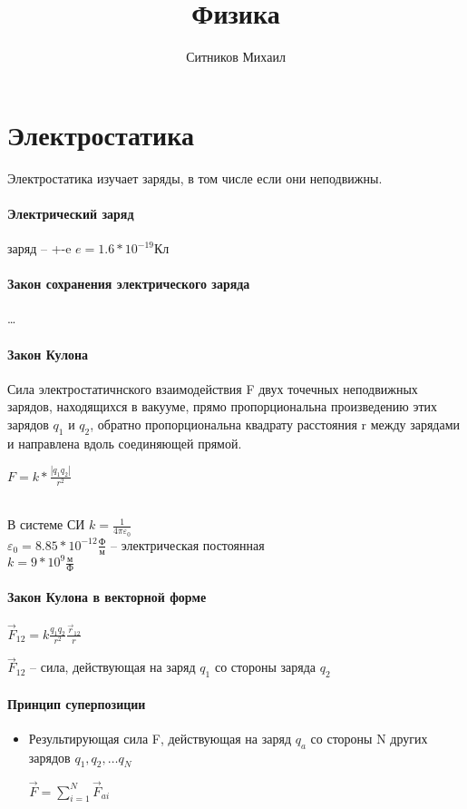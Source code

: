 \documentclass[a4paper]{article}
\title{Физика}
\author{Ситников Михаил}
\begin{document}
\maketitle
\tableofcontents
\newpage
\section{Электростатика}
Электростатика изучает заряды, в том числе если они неподвижны.
\paragraph{Электрический заряд}
\begin{itemize}
   заряд -- +-e
  $e = 1.6 * 10^{-19}$Кл

\end{itemize}
\paragraph{Закон сохранения электрического заряда}
\ldots
\paragraph{Закон Кулона}
Сила электростатичнского взаимодействия F двух точечных неподвижных зарядов, находящихся в вакууме, прямо пропорциональна произведению этих зарядов $q_1$ и $q_2$, обратно пропорциональна квадрату расстояния r между зарядами и направлена вдоль соединяющей прямой.
\begin{center}
  $F = k* \frac{|q_1q_2|}{r^2}$
\end{center}
\\ В системе СИ $k= \frac{1}{4\pi \varepsilon_0}$
\\ $\varepsilon_0 = 8.85*10^{-12} \frac{Ф}{м}$ -- электрическая постоянная
\\ $k = 9*10^{9} \frac{м}{Ф}$
\paragraph{Закон Кулона в векторной форме}
\par $\vec{F}_{12} = k \frac{q_1q_2}{r^2} \frac{\vec{r}_{12}}{r}$

\par $\vec{F}_{12}$ -- сила, действующая на заряд $q_1$ со стороны заряда $q_2$
\paragraph{Принцип суперпозиции}
\begin{itemize}
  \item Результирующая сила F, действующая на заряд $q_a$ со стороны N других зарядов $q_1, q_2, \ldots q_N$ 
    \begin{center}
      $\vec{F} = \sum_{i=1}^{N} \vec{F}_{ai}$
    \end{center}
\end{itemize}
\end{document}
